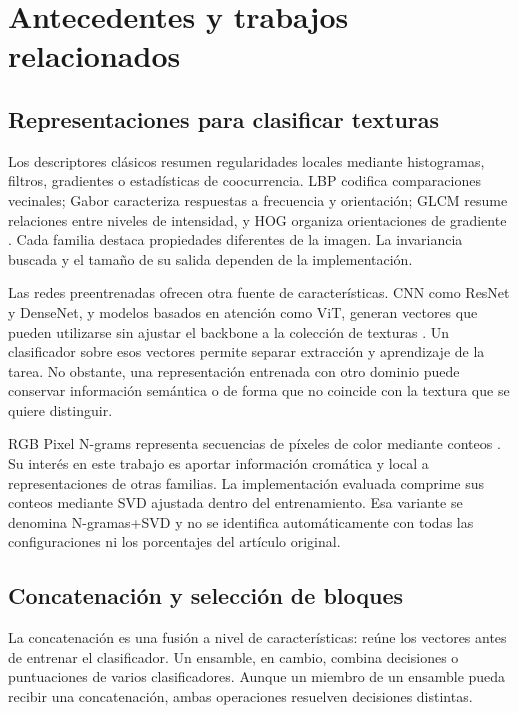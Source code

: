 \chapter{Antecedentes y trabajos relacionados}\label{sec:trabajos}

\section{Representaciones para clasificar texturas}
Los descriptores clásicos resumen regularidades locales mediante histogramas, filtros, gradientes o estadísticas de coocurrencia. LBP codifica comparaciones vecinales; Gabor caracteriza respuestas a frecuencia y orientación; GLCM resume relaciones entre niveles de intensidad, y HOG organiza orientaciones de gradiente \citep{ojala2002lbp,jain1991gabor,haralick1979glcm,dalal2005hog}. Cada familia destaca propiedades diferentes de la imagen. La invariancia buscada y el tamaño de su salida dependen de la implementación.

Las redes preentrenadas ofrecen otra fuente de características. CNN como ResNet y DenseNet, y modelos basados en atención como ViT, generan vectores que pueden utilizarse sin ajustar el backbone a la colección de texturas \citep{he2016resnet,huang2017densenet,dosovitskiy2021vit}. Un clasificador sobre esos vectores permite separar extracción y aprendizaje de la tarea. No obstante, una representación entrenada con otro dominio puede conservar información semántica o de forma que no coincide con la textura que se quiere distinguir.

RGB Pixel N-grams representa secuencias de píxeles de color mediante conteos \citep{paiva2023rgb}. Su interés en este trabajo es aportar información cromática y local a representaciones de otras familias. La implementación evaluada comprime sus conteos mediante SVD ajustada dentro del entrenamiento. Esa variante se denomina N-gramas+SVD y no se identifica automáticamente con todas las configuraciones ni los porcentajes del artículo original.

\section{Concatenación y selección de bloques}
La concatenación es una fusión a nivel de características: reúne los vectores antes de entrenar el clasificador. Un ensamble, en cambio, combina decisiones o puntuaciones de varios clasificadores. Aunque un miembro de un ensamble pueda recibir una concatenación, ambas operaciones resuelven decisiones distintas.


